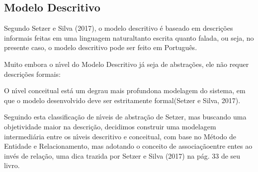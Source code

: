 \documentclass[
12pt,		%
openright,	%
twoside,  %
a4paper,			%
chapter=TITLE,		%
english,			%
french,				%
spanish,			%
brazil				%
]{USPSC-classe/USPSC_RedarTex}
\begin{document}
\subsection[Modelo Descritivo]{Modelo Descritivo}\label{Modelo Descritivo}
Segundo Setzer e Silva (2017), o modelo descritivo \'e baseado em \textquotedbl descri\c{c}\~oes informais feitas em uma linguagem natural\textquotedbl  tanto escrita quanto falada, ou seja, no presente caso, o modelo descritivo pode ser feito em Portugu\^es.










Muito embora o n\'{\i}vel do Modelo Descritivo j\'a seja de abstra\c{c}\~oes, ele n\~ao requer descri\c{c}\~oes formais:











\noindent\begin{center}\mbox{\centering{}}\end{center}


O n\'{\i}vel conceitual est\'a \textquotedbl um degrau mais profundo\textquotedbl  na modelagem do sistema, em que \textquotedbl o modelo desenvolvido deve ser estritamente formal\textquotedbl  (Setzer e Silva, 2017).










Seguindo esta classifica\c{c}\~ao de n\'{\i}veis de abstra\c{c}\~ao de Setzer, mas buscando uma objetividade maior na descri\c{c}\~ao, decidimos construir uma modelagem intermedi\'aria entre os n\'{\i}veis descritivo e conceitual, com base no M\'etodo de Entidade e Relacionamento, mas adotando o conceito de \textquotedbl associa\c{c}\~ao\textquotedbl  entre entes ao inv\'es de \textquotedbl rela\c{c}\~ao\textquotedbl , uma dica trazida por  Setzer e Silva (2017) na p\'ag. 33 de seu livro.
\end{document}
